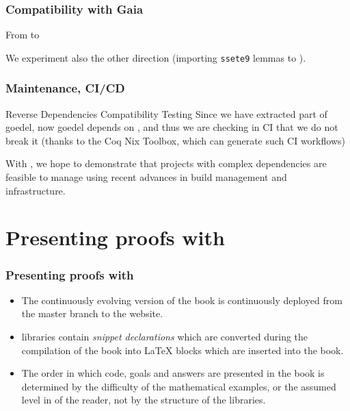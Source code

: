 \documentclass[10pt, fleqn]{beamer}
\begin{document}


\begin{frame}
  \frametitle{Compatibility with Gaia}
  \begin{block}{From \Hydras to \gaia}
    {\footnotesize
      }
    
  \end{block}
  \begin{block}{}
    We experiment also the other direction (importing \texttt{ssete9} lemmas to \Hydras).
  \end{block}
\end{frame}

\begin{frame}
  \frametitle{Maintenance, CI/CD}
 

  \begin{block}{Reverse Dependencies Compatibility Testing}
    Since we have extracted part of {\color{plugincolor}goedel}, now {\color{plugincolor}goedel} depends on {\color{plugincolor}\Hydras}, and thus we are checking in CI that we do not break it (thanks to the \textcolor{lookcolor}{Coq Nix Toolbox},
    which can generate such CI workflows)
  \end{block}

  \begin{block}{}
    With \Hydras, we hope to demonstrate that projects with complex dependencies are feasible to manage using recent advances in build management and infrastructure.
  \end{block}

\end{frame}

\section{Presenting proofs with \alectr}
\begin{frame}
  \frametitle{Presenting proofs with \alectr}
  \begin{block}{}
    \begin{itemize}
 \item     The continuously evolving version of the book is continuously deployed from the master branch to the \community website.

     \item
      \coq libraries contain \emph{snippet declarations} which are converted during the compilation of the book into \LaTeX\xspace blocks which are inserted into the book.

    \item The order in which \coq code, goals and answers are presented in the book is determined by the difficulty of the mathematical examples, or the assumed level in \coq of the reader, not by the structure of the libraries.
  
  
    \end{itemize}
  \end{block}
\end{frame}
\end{document}
